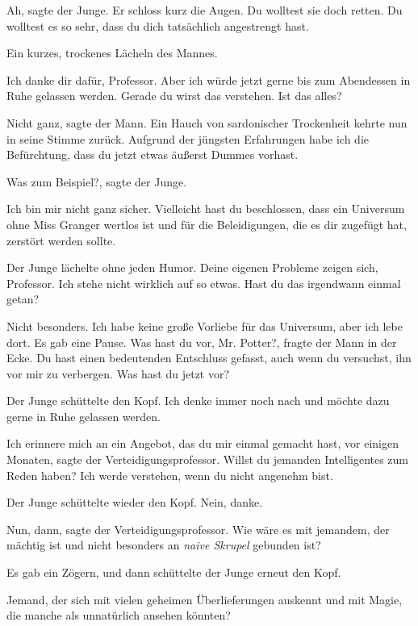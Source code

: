 \glqq{}Ah\grqq{}, sagte der Junge. Er schloss kurz die Augen. \glqq{}Du wolltest
sie doch retten. Du wolltest es so sehr, dass du dich tatsächlich angestrengt
hast.\grqq{}

Ein kurzes, trockenes Lächeln des Mannes.

\glqq{}Ich danke dir dafür, Professor. Aber ich würde jetzt gerne bis zum
Abendessen in Ruhe gelassen werden. Gerade du wirst das verstehen. Ist das
alles?\grqq{}

\glqq{}Nicht ganz\grqq{}, sagte der Mann. Ein Hauch von sardonischer Trockenheit
kehrte nun in seine Stimme zurück. \glqq{}Aufgrund der jüngsten Erfahrungen habe
ich die Befürchtung, dass du jetzt etwas äußerst Dummes vorhast.\grqq{}

\glqq{}Was zum Beispiel?\grqq{}, sagte der Junge.

\glqq{}Ich bin mir nicht ganz sicher. Vielleicht hast du beschlossen, dass ein
Universum ohne Miss Granger wertlos ist und für die Beleidigungen, die es dir
zugefügt hat, zerstört werden sollte.\grqq{}

Der Junge lächelte ohne jeden Humor. \glqq{}Deine eigenen Probleme zeigen sich,
Professor. Ich stehe nicht wirklich auf so etwas. Hast du das irgendwann einmal
getan?\grqq{}

\glqq{}Nicht besonders. Ich habe keine große Vorliebe für das Universum, aber ich
lebe dort.\grqq{} Es gab eine Pause. \glqq{}Was hast du vor, Mr. Potter?\grqq{},
fragte der Mann in der Ecke. \glqq{}Du hast einen bedeutenden Entschluss gefasst,
auch wenn du versuchst, ihn vor mir zu verbergen. Was hast du jetzt vor?\grqq{}

Der Junge schüttelte den Kopf. \glqq{}Ich denke immer noch nach und möchte dazu
gerne in Ruhe gelassen werden.\grqq{}

\glqq{}Ich erinnere mich an ein Angebot, das du mir einmal gemacht hast, vor
einigen Monaten\grqq{}, sagte der Verteidigungsprofessor. \glqq{}Willst du
jemanden Intelligentes zum Reden haben? Ich werde verstehen, wenn du nicht
angenehm bist.\grqq{}

Der Junge schüttelte wieder den Kopf. \glqq{}Nein, danke.\grqq{}

\glqq{}Nun, dann\grqq{}, sagte der Verteidigungsprofessor. \glqq{}Wie wäre es mit
jemandem, der mächtig ist und nicht besonders an\emph{ naive Skrupel} gebunden
ist?\grqq{}

Es gab ein Zögern, und dann schüttelte der Junge erneut den Kopf.

\glqq{}Jemand, der sich mit vielen geheimen Überlieferungen auskennt und mit
Magie, die manche als unnatürlich ansehen könnten?\grqq{}

